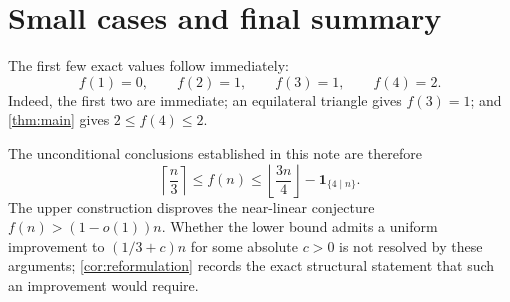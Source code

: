\documentclass[11pt]{article}
\theoremstyle{definition}
\theoremstyle{remark}
\newcommand{\ind}{\mathbf{1}}
\begin{document}
\section{Small cases and final summary}

The first few exact values follow immediately:
\[
 f(1)=0,\qquad f(2)=1,\qquad f(3)=1,\qquad f(4)=2.
\]
Indeed, the first two are immediate; an equilateral triangle gives $f(3)=1$; and \cref{thm:main} gives $2\le f(4)\le2$.

The unconditional conclusions established in this note are therefore
\[
 \boxed{
 \left\lceil\frac n3\right\rceil
 \le f(n)
 \le
 \left\lfloor\frac{3n}{4}\right\rfloor-
 \ind_{\{4\mid n\}}.}
\]
The upper construction disproves the near-linear conjecture $f(n)>(1-o(1))n$.  Whether the lower bound admits a uniform improvement to $(1/3+c)n$ for some absolute $c>0$ is not resolved by these arguments; \cref{cor:reformulation} records the exact structural statement that such an improvement would require.
\end{document}
